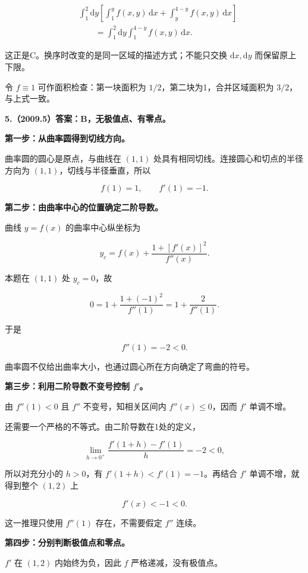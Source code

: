 \documentclass[UTF8,11pt,fontset=windows]{ctexart}
\begin{document}
$$
\begin{aligned}
&\int_1^2\mathrm dy\left[
\int_1^y f(x,y)\,\mathrm dx
+\int_y^{4-y}f(x,y)\,\mathrm dx\right]\\
&\qquad=\boxed{\int_1^2\mathrm dy\int_1^{4-y}f(x,y)\,\mathrm dx}.
\end{aligned}
$$

这正是C。换序时改变的是同一区域的描述方式；不能只交换 $\mathrm dx,\mathrm dy$ 而保留原上下限。

令 $f\equiv1$ 可作面积检查：第一块面积为 $1/2$，第二块为1，合并区域面积为 $3/2$，与上式一致。

\clearpage

\textbf{5.（2009.5）答案：B，无极值点、有零点。}

\textbf{第一步：从曲率圆得到切线方向。}

曲率圆的圆心是原点，与曲线在 $(1,1)$ 处具有相同切线。连接圆心和切点的半径方向为 $(1,1)$，切线与半径垂直，所以

$$
f(1)=1,\qquad f'(1)=-1.
$$

\textbf{第二步：由曲率中心的位置确定二阶导数。}

曲线 $y=f(x)$ 的曲率中心纵坐标为

$$
y_c=f(x)+\frac{1+[f'(x)]^2}{f''(x)}.
$$

本题在 $(1,1)$ 处 $y_c=0$，故

$$
0=1+\frac{1+(-1)^2}{f''(1)}
=1+\frac2{f''(1)}.
$$

于是

$$
f''(1)=-2<0.
$$

曲率圆不仅给出曲率大小，也通过圆心所在方向确定了弯曲的符号。

\textbf{第三步：利用二阶导数不变号控制 $f'$。}

由 $f''(1)<0$ 且 $f''$ 不变号，知相关区间内 $f''(x)\le0$，因而 $f'$ 单调不增。

还需要一个严格的不等式。由二阶导数在1处的定义，

$$
\lim_{h\to0^+}\frac{f'(1+h)-f'(1)}h=-2<0,
$$

所以对充分小的 $h>0$，有 $f'(1+h)<f'(1)=-1$。再结合 $f'$ 单调不增，就得到整个 $(1,2)$ 上

$$
f'(x)<-1<0.
$$

这一推理只使用 $f''(1)$ 存在，不需要假定 $f''$ 连续。

\textbf{第四步：分别判断极值点和零点。}

$f'$ 在 $(1,2)$ 内始终为负，因此 $f$ 严格递减，没有极值点。
\end{document}
